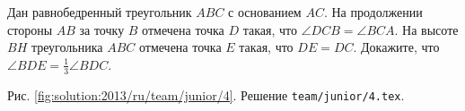 \problem{}
Дан равнобедренный треугольник $ABC$ с основанием $AC$.
На продолжении стороны $AB$ за точку $B$ отмечена точка $D$ такая, что
$\angle DCB = \angle BCA$.
На высоте $BH$ треугольника $ABC$ отмечена точка $E$ такая, что $DE = DC$.
Докажите, что $\angle BDE = \frac{1}{3} \angle BDC$. 

%
\label{solution:2013/ru/team/junior/4}
Рис. \ref{fig:solution:2013/ru/team/junior/4}.
Решение \texttt{team/junior/4.tex}.
\endproblem
